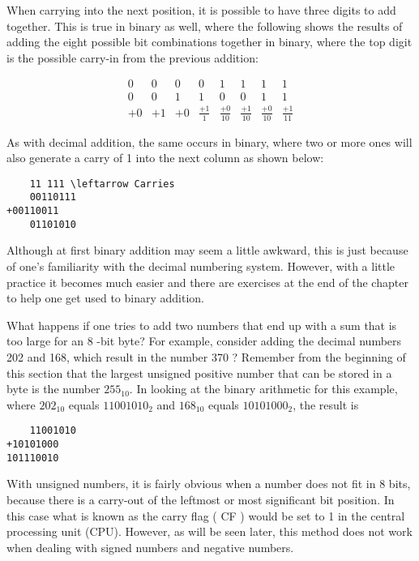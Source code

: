 \documentclass[10pt]{article}
\begin{document}
When carrying into the next position, it is possible to have three digits to add together. This is true in binary as well, where the following shows the results of adding the eight possible bit combinations together in binary, where the top digit is the possible carry-in from the previous addition:

$$
\begin{array}{rrrrrrrr}
0 & 0 & 0 & 0 & 1 & 1 & 1 & 1 \\
0 & 0 & 1 & 1 & 0 & 0 & 1 & 1 \\
+0 & +1 & +0 & \frac{+1}{1} & \frac{+0}{10} & \frac{+1}{10} & \frac{+0}{10} & \frac{+1}{11}
\end{array}
$$

As with decimal addition, the same occurs in binary, where two or more ones will also generate a carry of 1 into the next column as shown below:

\begin{verbatim}
    11 111 \leftarrow Carries
    00110111
+00110011
    01101010
\end{verbatim}

Although at first binary addition may seem a little awkward, this is just because of one's familiarity with the decimal numbering system. However, with a little practice it becomes much easier and there are exercises at the end of the chapter to help one get used to binary addition.

What happens if one tries to add two numbers that end up with a sum that is too large for an 8 -bit byte? For example, consider adding the decimal numbers 202 and 168, which result in the number 370 ? Remember from the beginning of this section that the largest unsigned positive number that can be stored in a byte is the number $255_{10}$. In looking at the binary arithmetic for this example, where $202_{10}$ equals $11001010_{2}$ and $168_{10}$ equals $10101000_{2}$, the result is

\begin{verbatim}
    11001010
+10101000
101110010
\end{verbatim}

With unsigned numbers, it is fairly obvious when a number does not fit in 8 bits, because there is a carry-out of the leftmost or most significant bit position. In this case what is known as the carry flag ( CF ) would be set to 1 in the central processing unit (CPU). However, as will be seen later, this method does not work when dealing with signed numbers and negative numbers.
\end{document}
